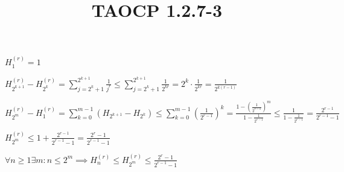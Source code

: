 \documentclass{article}
\title{TAOCP 1.2.7\mbox{-}3}
\begin{document}
\maketitle

\( H_{1}^{(r)} = 1 \)

\( H_{2^{k+1}}^{(r)} - H_{2^{k}}^{(r)} = \sum_{j=2^{k}+1}^{2^{k+1}} \frac{1}{j^{r}} \leq \sum_{j=2^{k}+1}^{2^{k+1}} \frac{1}{2^{kr}} = 2^{k} \cdot \frac{1}{2^{kr}} = \frac{1}{2^{k(r-1)}} \)

\( H_{2^{m}}^{(r)} - H_{1}^{(r)} = \sum_{k=0}^{m-1} (H_{2^{k+1}}-H_{2^{k}}) \leq \sum_{k=0}^{m-1}{(\frac{1}{2^{r-1}})}^{k} = \frac{1-{(\frac{1}{2^{r-1}})}^{m}}{1 - \frac{1}{2^{r-1}}} \leq \frac{1}{1 - \frac{1}{2^{r-1}}} = \frac{2^{r-1}}{2^{r-1} - 1} \)

\( H_{2^{m}}^{(r)} \leq 1 + \frac{2^{r-1}}{2^{r-1} - 1} = \frac{2^{r} - 1}{2^{r-1} - 1} \)

\( \forall n \geq 1 \exists m: n \leq 2^{m} \implies H_{n}^{(r)} \leq H_{2^{m}}^{(r)} \leq \frac{2^{r}-1}{2^{r-1} - 1} \)
\end{document}
